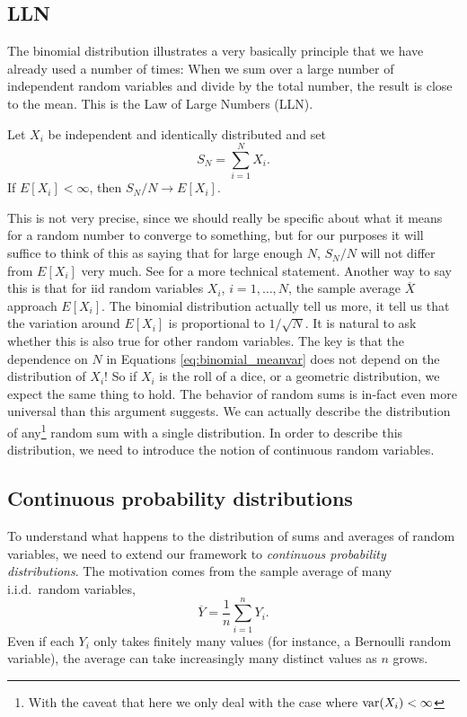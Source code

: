  \subsection{LLN}
The binomial distribution illustrates a very basically principle that we have already used a number of times: When we sum over a large number of independent random variables and divide by the total number, the result is close to the mean. This is the Law of Large Numbers (LLN). 
 \begin{thm} Let $X_i$ be independent and identically distributed and set
 \begin{equation*}
 S_N = \sum_{i=1}^N X_i.
 \end{equation*}
 If $E[X_i]<\infty$, then $S_N/N \to E[X_i]$. 
 \end{thm}
 This is not very precise, since we should really be specific about what it means for a random number to converge to something, but for our purposes it will suffice to think of this as saying that for large enough $N$, $S_N/N$ will not differ from $E[X_i]$ very much. See  \cite[Theorem 4.2.1]{evans} for a more technical statement. Another way to say this is that for iid random variables $X_i$, $i=1,\dots,N$, the sample average $\overline{X}$ approach $E[X_i]$. 
The binomial distribution actually tell us more, it tell us that the variation around $E[X_i]$ is proportional to $1/\sqrt{N}$. It is natural to ask whether this is also true for other random variables. The key is that the dependence on $N$ in Equations \ref{eq:binomial_meanvar} does not depend on the distribution of $X_i$! So if $X_i$ is the roll of a dice, or a geometric distribution, we expect the same thing to hold. 
The behavior of random sums is in-fact even more universal than this argument suggests. We can actually describe the distribution of any\footnote{With the caveat that here we only deal with the case where ${\rm var}(X_i)<\infty$} random sum with a single distribution.  In order to describe this distribution, we need to introduce the notion of continuous random variables. 

 \subsection{Continuous probability distributions}
To understand what happens to the distribution of sums and averages of random variables, we need to extend our framework to \emph{continuous probability distributions}. The motivation comes from the sample average of many i.i.d.\ random variables,  
\[
\overline{Y} = \frac{1}{n}\sum_{i=1}^n Y_i.
\]  
Even if each \(Y_i\) only takes finitely many values (for instance, a Bernoulli random variable), the average can take increasingly many distinct values as \(n\) grows.  

